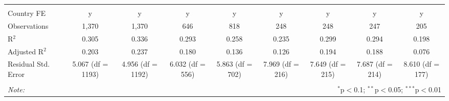 \begin{table}[!htbp]
\begin{tabular}{@{\extracolsep{5pt}}lcccccccc}
\hline \\[-1.8ex] 
Country FE & y & y & y & y & y & y & y & y \\ 
Observations & 1,370 & 1,370 & 646 & 818 & 248 & 248 & 247 & 205 \\ 
R$^{2}$ & 0.305 & 0.336 & 0.293 & 0.258 & 0.235 & 0.299 & 0.294 & 0.198 \\ 
Adjusted R$^{2}$ & 0.203 & 0.237 & 0.180 & 0.136 & 0.126 & 0.194 & 0.188 & 0.076 \\ 
Residual Std. Error & 5.067 (df = 1193) & 4.956 (df = 1192) & 6.032 (df = 556) & 5.863 (df = 702) & 7.969 (df = 216) & 7.649 (df = 215) & 7.687 (df = 214) & 8.610 (df = 177) \\ 
\hline 
\hline \\[-1.8ex] 
\textit{Note:}  & \multicolumn{8}{r}{$^{*}$p$<$0.1; $^{**}$p$<$0.05; $^{***}$p$<$0.01} \\ 
\end{tabular} 
\end{table} 

